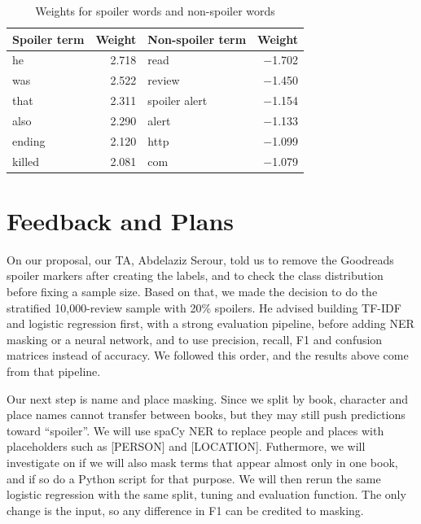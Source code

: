 \documentclass[11pt]{article}
\begin{document}
\begin{table}[t]
  \centering
  \small
  \begin{tabular}{lrlr}
    \hline
    \textbf{Spoiler term} & \textbf{Weight} & \textbf{Non-spoiler term} & \textbf{Weight} \\
    \hline
    he      &  2.718 & read          & $-$1.702 \\
    was     &  2.522 & review        & $-$1.450 \\
    that    &  2.311 & spoiler alert & $-$1.154 \\
    also    &  2.290 & alert         & $-$1.133 \\
    ending  &  2.120 & http          & $-$1.099 \\
    killed  &  2.081 & com           & $-$1.079 \\
    \hline
  \end{tabular}
  \caption{\label{tab:weights}Weights for spoiler words and non-spoiler words}
\end{table}

\section{Feedback and Plans}
\label{sec:plans}


On our proposal, our TA, Abdelaziz Serour, told us to remove the Goodreads spoiler markers after creating the labels, and to check the class distribution before fixing a sample size. Based on that, we made the decision to do the stratified 10,000-review sample with 20\% spoilers. He advised building TF-IDF and logistic regression first, with a strong evaluation pipeline, before adding NER masking or a neural network, and to use precision, recall, F1 and confusion matrices instead of accuracy. We followed this order, and the results above come from that pipeline. 

Our next step is name and place masking. Since we split by book, character and place names cannot transfer between books, but they may still push predictions toward “spoiler”. We will use spaCy NER to replace people and places with placeholders such as [PERSON] and [LOCATION]. Futhermore, we will investigate on if we will also mask terms that appear almost only in one book, and if so do a Python script for that purpose. We will then rerun the same logistic regression with the same split, tuning and evaluation function. The only change is the input, so any difference in F1 can be credited to masking.
\end{document}
